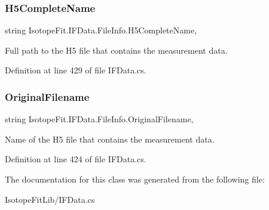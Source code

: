 \subsubsection{\texorpdfstring{H5\+Complete\+Name}{H5CompleteName}}
{\footnotesize\ttfamily string Isotope\+Fit.\+I\+F\+Data.\+File\+Info.\+H5\+Complete\+Name\hspace{0.3cm}{\ttfamily [get]}, {\ttfamily [set]}}



Full path to the H5 file that contains the measurement data. 



Definition at line 429 of file I\+F\+Data.\+cs.

\mbox{\label{class_isotope_fit_1_1_i_f_data_1_1_file_info_a465af980a8c2f2a971d213e328b5932c}} 
\subsubsection{\texorpdfstring{Original\+Filename}{OriginalFilename}}
{\footnotesize\ttfamily string Isotope\+Fit.\+I\+F\+Data.\+File\+Info.\+Original\+Filename\hspace{0.3cm}{\ttfamily [get]}, {\ttfamily [set]}}



Name of the H5 file that contains the measurement data. 



Definition at line 424 of file I\+F\+Data.\+cs.



The documentation for this class was generated from the following file\+:\begin{DoxyCompactItemize}
\item 
Isotope\+Fit\+Lib/I\+F\+Data.\+cs\end{DoxyCompactItemize}
